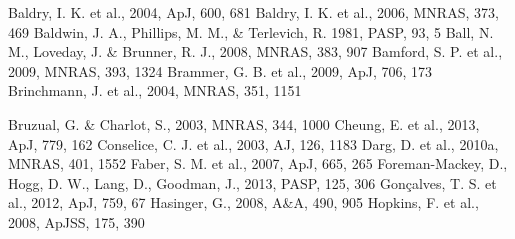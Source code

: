 \documentclass[useAMS,usenatbib]{mn2e}
\begin{document}
\begin{thebibliography}{}
 Baldry, I. K. et al., 2004, ApJ, 600, 681
 Baldry, I. K. et al., 2006, MNRAS, 373, 469
 Baldwin, J. A., Phillips, M. M., \& Terlevich, R. 1981, PASP, 93, 5
 Ball, N. M., Loveday, J. \& Brunner, R. J., 2008, MNRAS, 383, 907
 Bamford, S. P. et al., 2009, MNRAS, 393, 1324
 Brammer, G. B. et al., 2009, ApJ, 706, 173
 Brinchmann, J. et al., 2004, MNRAS, 351, 1151

 Bruzual, G. \& Charlot, S., 2003, MNRAS, 344, 1000
 Cheung, E. et al., 2013, ApJ, 779, 162
 Conselice, C. J. et al., 2003, AJ, 126, 1183
 Darg, D. et al., 2010a, MNRAS, 401, 1552
 Faber, S. M. et al., 2007, ApJ, 665, 265
 Foreman-Mackey, D., Hogg, D. W., Lang, D., Goodman, J., 2013, PASP, 125, 306
 Gon\c calves, T. S. et al., 2012, ApJ, 759, 67
 Hasinger, G., 2008, A\&A, 490, 905
 Hopkins, F. et al., 2008, ApJSS, 175, 390


\end{thebibliography}
\end{document}
